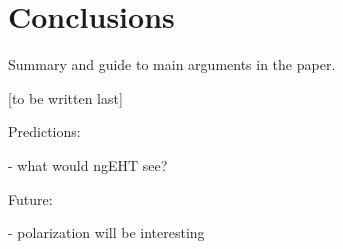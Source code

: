 \section{Conclusions}\label{sec:conclusions}

Summary and guide to main arguments in the paper.

[to be written last]

Predictions:

- what would ngEHT see?

Future:

- polarization will be interesting

